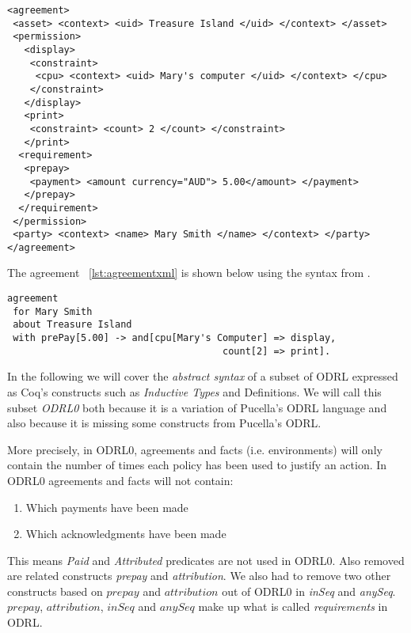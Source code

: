 \lstset{language=XML}
\begin{lstlisting}[caption={agreement for Mary Smith in XML},label={lst:agreementxml}]
<agreement>
 <asset> <context> <uid> Treasure Island </uid> </context> </asset>
 <permission>
   <display>
    <constraint>
     <cpu> <context> <uid> Mary's computer </uid> </context> </cpu>
    </constraint>
   </display>
   <print>
    <constraint> <count> 2 </count> </constraint>
   </print>
  <requirement>
   <prepay>
    <payment> <amount currency="AUD"> 5.00</amount> </payment>
   </prepay>
  </requirement>
 </permission>
 <party> <context> <name> Mary Smith </name> </context> </party>
</agreement>
\end{lstlisting}

The agreement ~\ref{lst:agreementxml} is shown below using the syntax from \cite{pucella2006}.

\lstset{language=Pucella2006}
\begin{minipage}[c]{0.95\textwidth}
\begin{lstlisting}[frame=single, caption={agreement for Mary Smith as BNF (as used in ~\cite{pucella2006})},label={lst:agreementpucella2006}]
agreement
 for Mary Smith 
 about Treasure Island 
 with prePay[5.00] -> and[cpu[Mary's Computer] => display,
                                      count[2] => print].
\end{lstlisting}
\end{minipage} 

In the following we will cover the \emph{abstract syntax} of a subset of ODRL expressed as Coq's constructs such as \emph{Inductive Types} and Definitions. We will call this subset \emph{ODRL0} both because it is a variation of Pucella's ODRL language and also because it is missing some constructs from Pucella's ODRL. 

More precisely, in ODRL0, agreements and facts (i.e. environments) will only contain the number of times each policy has been used to justify an action. In ODRL0 agreements and facts will not contain: \begin{enumerate}
  \item Which payments have been made
  \item Which acknowledgments have been made
\end{enumerate} 

This means \emph{Paid} and \emph{Attributed} predicates are not used in ODRL0. Also removed are related constructs \emph{prepay} and \emph{attribution}. We also had to remove two other constructs based on $prepay$ and $attribution$ out of ODRL0 in \emph{inSeq} and \emph{anySeq}. $prepay$, $attribution$, $inSeq$ and $anySeq$ make up what is called \emph{requirements} in ODRL.

